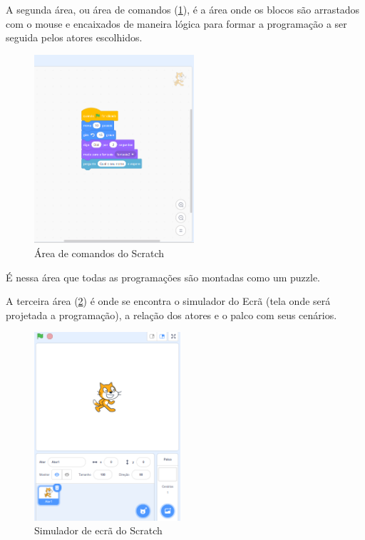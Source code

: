 \documentclass[12pt, openright, a4paper, brazil, english, french, spanish, bibjustif, openany, oneside]{abntex2}
\begin{document}
A segunda área, ou área de comandos (\ref{scr3}), é a área onde os blocos são arrastados com o mouse e encaixados de maneira lógica para formar a programação a ser seguida pelos atores escolhidos.

\begin{figure}[h]

    \center

    \includegraphics[height=7cm]{scratch3.png}
    \caption{Área de comandos do Scratch \label{scr3}}
    
\end{figure}

É nessa área que todas as programações são montadas como um puzzle.


A terceira área (\ref{scr4}) é onde se encontra o simulador do Ecrã (tela onde será projetada a programação), a relação dos atores e o palco com seus cenários.

\begin{figure}[h]

    \center

    \includegraphics[height=7cm]{scratch4.png}
    \caption{Simulador de ecrã do Scratch \label{scr4}}
    
\end{figure}
\end{document}
